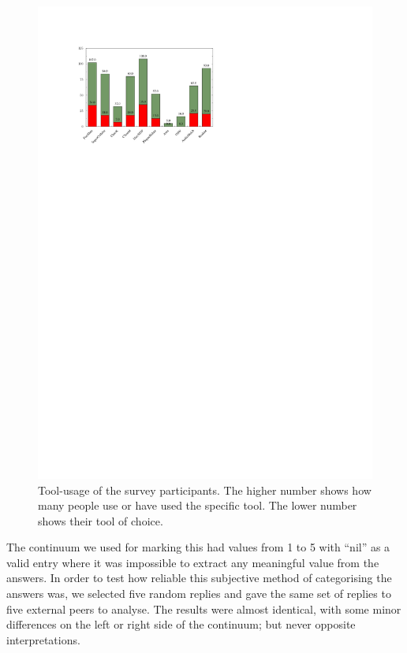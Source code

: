 \begin{figure}[t]
\centering
\includegraphics[width=\textwidth]{img-2-eps-converted-to.pdf}
\caption{Tool-usage of the survey participants. The higher number shows
how many people use or have used the specific tool. The lower number shows their
tool of choice.}
\label{Magnusson:fig:2} 
\end{figure}

The continuum we used for marking this had values from 1 to 5 with ``nil'' as a
valid entry where it was impossible to extract any meaningful value from the
answers. In order to test how reliable this subjective method of categorising the
answers was, we selected five random replies and gave the same set of replies to
five external peers to analyse. The results were almost identical, with some
minor differences on the left or right side of the continuum; but never opposite
interpretations.


